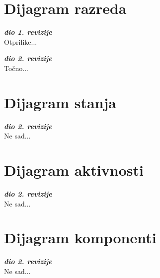 			\eject
			
			
		\section{Dijagram razreda}
		
			\textbf{\textit{dio 1. revizije}}\\
			
			Otprilike...
			
			\textbf{\textit{dio 2. revizije}}\\			
			
			Točno...
			
			\eject
		
		\section{Dijagram stanja}
			
			
			\textbf{\textit{dio 2. revizije}}\\
			
			Ne sad...
			
			
			\eject 
		
		\section{Dijagram aktivnosti}
			
			\textbf{\textit{dio 2. revizije}}\\
			
			Ne sad...
			
			\eject
		\section{Dijagram komponenti}
		
			\textbf{\textit{dio 2. revizije}}\\
		
			Ne sad...